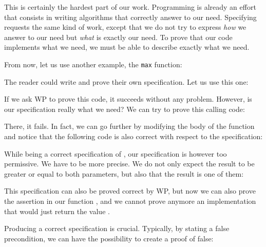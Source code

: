 


This is certainly the hardest part of our work. Programming is already
an effort that consists in writing algorithms that correctly answer to
our need. Specifying requests the same kind of work, except that we do
not try to express \emph{how} we answer to our need but \emph{what} is
exactly our need. To prove that our code implements what we need, we
must be able to describe exactly what we need.

From now, let us use another example, the \texttt{max} function:






The reader could write and prove their own specification. Let us
use this one:






If we ask WP to prove this code, it succeeds without any problem.
However, is our specification really what we need? We can try to prove this
calling code:






There, it fails. In fact, we can go further by modifying the body of
the  function and notice that the following code is also
correct with respect to the specification:






While being a correct specification of , our specification
is however too permissive. We have to be more precise. We do
not only expect the result to be greater or equal to both parameters,
but also that the result is one of them:





This specification can also be proved correct by WP, but now we can also prove
the assertion in our function , and we cannot prove anymore an
implementation that would just return the value .




Producing a correct specification is crucial. Typically, by stating a
false precondition, we can have the possibility to create a proof of
false:


